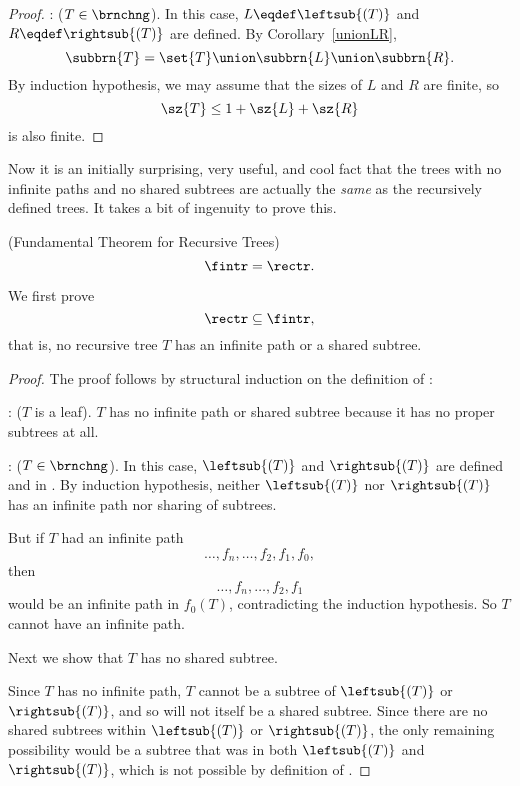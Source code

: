 \begin{definition}
\begin{corollary}
\begin{proof}
: ($T \in \brnchng$).  In this case,
$L \eqdef \leftsub{(T)}$ and $R \eqdef \rightsub{(T)}$ are defined.
By Corollary~\ref{unionLR},
\begin{equation}\label{unionTLR}
\subbrn{T} = \set{T} \union \subbrn{L} \union \subbrn{R}.
\end{equation}
By induction hypothesis, we may assume that the sizes of $L$ and $R$
are finite, so
\[
\sz{T} \leq 1 + \sz{L} + \sz{R}
\]
is also finite.
\end{proof}
\end{corollary}

Now it is an initially surprising, very useful, and cool fact that the
trees with no infinite paths and no shared subtrees are actually the
\emph{same} as the recursively defined trees.  It takes a bit of
ingenuity to prove this.

\begin{theorem}\label{fundthmrec}(Fundamental Theorem for Recursive Trees)
\[
\fintr = \rectr.
\]
\end{theorem}

We first prove
\begin{equation}\label{rectrsubfintr}
\rectr \subseteq \fintr,
\end{equation}
that is, no recursive tree $T$ has an infinite path or a shared subtree.

\begin{proof}
The proof follows by structural induction on the
definition of \rectr:

: ($T$ is a leaf).  $T$ has no infinite path
or shared subtree because it has no proper subtrees at all.

: ($T \in \brnchng$).  In this case,
$\leftsub{(T)}$ and $\rightsub{(T)}$ are defined and in \rectr.  By
induction hypothesis, neither $\leftsub{(T)}$ nor $\rightsub{(T)}$ has an
infinite path nor sharing of subtrees.

But if $T$ had an infinite path
\[
\dots,f_n,\dots, f_2,f_1,f_0,
\]
then
\begin{equation}\label{dfnf2f1}
\dots,f_n,\dots,f_2,f_1
\end{equation}
would be an infinite path in $f_0(T)$, contradicting the induction
hypothesis.  So $T$ cannot have an infinite path.

Next we show that $T$ has no shared subtree.

Since $T$ has no infinite path, $T$ cannot be a subtree of
$\leftsub{(T)}$ or $\rightsub{(T)}$, and so will not itself be a
shared subtree.  Since there are no shared subtrees within
$\leftsub{(T)}$ or $\rightsub{(T)}$, the only remaining possibility
would be a subtree that was in both $\leftsub{(T)}$ and
$\rightsub{(T)}$, which is not possible by definition of \rectr.
\end{proof}


\end{definition}
